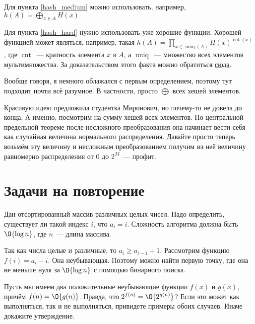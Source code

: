 \documentclass[addpoints]{exam}
\DeclareMathOperator{\uniq}{uniq}
\DeclareMathOperator{\cnt}{cnt}
\begin{document}
\begin{questions}
\begin{solution}
Для пункта \ref{hash_medium} можно использовать, например, $h(A) = \bigoplus\limits_{x \in A} H(x)$

Для пункта \ref{hash_hard} нужно использовать уже хорошие функции. Хорошей функцией может являться, например, такая $h(A) = \prod\limits_{x \in \uniq(A)} H(x)^{\cnt(x)}$, где $\cnt$~--- кратность элемента $x$ в $A$, а $\uniq$~--- множество всех элементов мультимножества. За доказательством этого факта можно обратиться \href{http://link.springer.com/chapter/10.1007%2F978-3-540-40061-5_12}{сюда}.

Вообще говоря, я немного облажался с первым определением, поэтому тут подходит почти всё разумное. В частности, просто $\bigoplus$ всех хешей элементов. 

Красивую идею предложила студентка Миронович, но почему-то не довела до конца. А именно, посмотрим на сумму хешей всех элементов. По центральной предельной теореме после несложного преобразования она начинает вести себя как случайная величина нормального распределения. Давайте просто теперь возьмём эту величину и несложным преобразованием получим из неё величину равномерно распределения от $0$ до $2^M$~--- профит. 

\end{solution}

\section{Задачи на повторение}

\question[\half] \label{binary_search} Дан отсортированный массив различных целых чисел. Надо определить, существует ли такой индекс $i$, что $a_i = i$. Сложность алгоритма должна быть $\O{\log{n}}$, где $n$~--- длина массива.

\begin{solution}

Так как числа целые и различные, то $a_i \geqslant a_{i - 1} + 1$. Рассмотрим функцию $f(i) = a_i - i$. Она неубывающая. Поэтому можно найти первую точку, где она не меньше нуля за $\O{\log{n}}$ с помощью бинарного поиска.

\end{solution}

\question[\half] Пусть мы имеем два положительные неубывающие функции $f(x)$ и $g(x)$, причём $f(n) = \O{g(n)}$. Правда, что $2^{f(n)} = \O{2^{g(n)}}$? Если это может как выполняться, так и не выполняться, привидете примеры обоих случаев. Иначе докажите утверждение.

\begin{solution}


\end{solution}
\end{questions}
\end{document}
